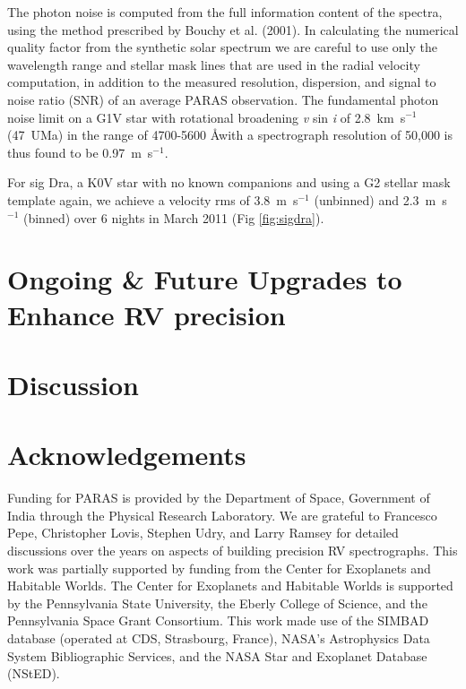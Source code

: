 \documentclass[12pt,preprint]{emulateapj}
\begin{document}
The photon noise is computed from the full information content of the spectra, using the method prescribed by Bouchy et al. (2001). In calculating the numerical quality factor from the synthetic solar spectrum we are careful to use only the wavelength range and stellar mask lines that are used in the radial velocity computation, in addition to the measured resolution, dispersion, and signal to noise ratio (SNR) of an average PARAS observation. The fundamental photon noise limit on a G1V star with rotational broadening {\it v} sin {\it i} of 2.8~km~s$^{-1}$ (47~UMa) in the range of 4700-5600 \AA with a spectrograph resolution of 50,000 is thus found to be 0.97~m~s$^{-1}$.

For sig Dra, a K0V star with no known companions and using a G2 stellar mask template again, we achieve a velocity rms of 3.8~m~s$^{-1}$ (unbinned) and 2.3~m~s$^{-1}$ (binned) over 6 nights in March 2011 (Fig \ref{fig:sigdra}). 

\section{Ongoing \& Future Upgrades to Enhance RV precision}
\section{Discussion}

\section*{Acknowledgements}
Funding for PARAS is provided by the Department of Space, Government of India through the Physical Research Laboratory.
We are grateful to Francesco Pepe, Christopher Lovis, Stephen Udry, and Larry Ramsey for detailed discussions over the years on aspects of building precision RV spectrographs.
This work was partially supported by funding from the Center for Exoplanets and Habitable Worlds. The
Center for Exoplanets and Habitable Worlds is supported by the
Pennsylvania State University, the Eberly College of Science, and the
Pennsylvania Space Grant Consortium.  This work made use of the
SIMBAD database (operated at CDS, Strasbourg, France), NASA's
Astrophysics Data System Bibliographic Services, and the NASA Star and
Exoplanet Database (NStED).
\end{document}
